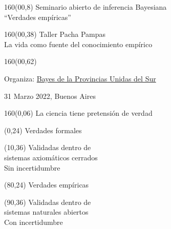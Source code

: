 \documentclass[shownotes,aspectratio=169]{beamer}
\begin{document}
\color{black!85}
\large

 


\begin{frame}
\begin{textblock}{160}(00,8)
\centering
\LARGE Seminario abierto de inferencia Bayesiana \\
\Large ``Verdades empíricas''
\end{textblock}


\begin{textblock}{160}(00,38) \centering
\Large Taller Pacha Pampas \\
\large La vida como fuente del conocimiento empírico
\end{textblock}



\begin{textblock}{160}(00,62) \centering

Organiza: \href{https://github.com/BayesDeLasProvinciasUnidasDelSur/curso}{Bayes de la Provincias Unidas del Sur}

\vspace{0.5cm}

31 Marzo 2022, Buenos Aires
\end{textblock}

\end{frame}


\begin{frame}[plain]
 \begin{textblock}{160}(0,06) \centering
  \LARGE La ciencia tiene pretensión de verdad
\end{textblock}

 \begin{textblock}{80}(0,24) \centering
 \Large Verdades formales 
\end{textblock}

\begin{textblock}{60}(10,36) \centering
 Validadas dentro de \\ sistemas axiomáticos cerrados \\[0.2cm]
 
 
 Sin incertidumbre
\end{textblock}

\begin{textblock}{80}(80,24) \centering
 \Large Verdades empíricas
\end{textblock}

\begin{textblock}{60}(90,36) \centering
 Validadas dentro de \\ sistemas naturales abiertos\\[0.2cm]
  
 Con incertidumbre
\end{textblock}



\end{frame}
\end{document}
